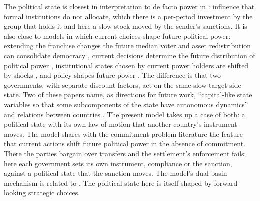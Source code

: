 The political state is closest in interpretation to de facto power in
\citet{AcemogluRobinson2008}: influence that formal institutions do not
allocate, which there is a per-period investment by the group that holds it
\citep[p.~272]{AcemogluRobinson2008} and here a slow stock moved by the
sender's sanctions. It is also close to models in which current choices shape
future political power: extending the franchise changes the future median
voter and asset redistribution can consolidate democracy
\citep{AcemogluRobinson2001}, current decisions determine the future
distribution of political power \citep{AcemogluEgorovSonin2012}, institutional
states chosen by current power holders are shifted by shocks
\citep{AcemogluEgorovSonin2015}, and policy shapes future power
\citep{BaiLagunoff2011}. The difference is that two governments, with separate
discount factors, act on the same slow target-side state. Two of these papers name, as
directions for future work, ``capital-like state variables so that some
subcomponents of the state have autonomous dynamics''
\citep[Section~VI]{AcemogluEgorovSonin2012} and relations between countries
\citep[concluding section]{AcemogluEgorovSonin2015}. The present model takes up a
case of both: a political state with its own law of motion that another
country's instrument moves. The model shares with
the commitment-problem literature \citep{Powell2006} the feature that current
actions shift future political power in the absence of commitment. There the
parties bargain over transfers and the settlement's enforcement fails; here each
government sets its own instrument, compliance or the sanction, against a
political state that the sanction moves. The model's
dual-basin mechanism is related to \citet{HasslerEtAl2003}. The political
state here is itself shaped by forward-looking strategic choices.

